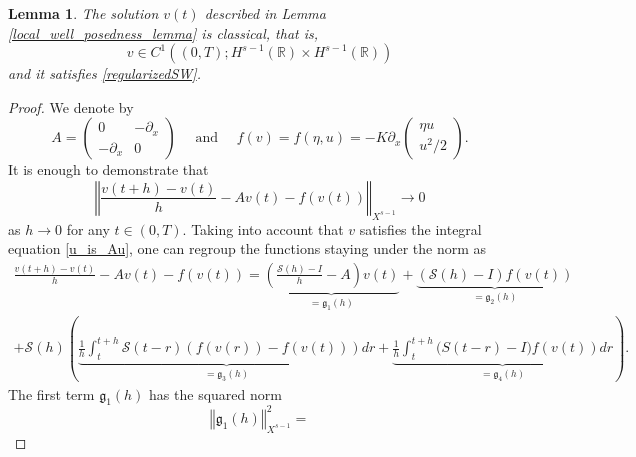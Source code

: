 \documentclass[reqno,12pt,a4paper]{article}
\theoremstyle{plain}
\newtheorem{lemma}[theorem]{\bf Lemma}
\newcommand{\R}{\mathbb{R}}
\newcommand{\norm}[1]{\left\Vert #1 \right\Vert}
\begin{document}
\begin{lemma}
\label{classical_solution_lemma}
    The solution $v(t)$ described in Lemma \ref{local_well_posedness_lemma}
    is classical,
    that is,
    \[
        v \in C^1 \left( (0, T); H^{s - 1}(\R) \times H^{s - 1}(\R) \right)
    \]
    and it satisfies \eqref{regularizedSW}.
\end{lemma}
%
\begin{proof}
%
We denote by
\begin{equation}
\label{A_and_f_definition}
    A
    =
    \begin{pmatrix}
        0
        &
        -\partial_x
        \\
        -\partial_x
        &
        0
    \end{pmatrix}
    \quad
    \text{ and }
    \quad
    f(v)
    =
    f(\eta, u)
    =
	-
    K \partial_x
	\begin{pmatrix}
		\eta u
		\\
		u^2 / 2
	\end{pmatrix}
    .
\end{equation}
%
It is enough to demonstrate that
\begin{equation*}
    \norm{
        \frac{v(t + h) - v(t)}h
        -
        Av(t)
        -
        f(v(t))
    }_{X^{s - 1}}
    \to 0
\end{equation*}
as $h \to 0$ for any $t \in (0, T)$.
Taking into account that $v$ satisfies the integral equation \eqref{u_is_Au},
one can regroup the functions staying under the norm as
\begin{multline*}
    \frac{v(t + h) - v(t)}h
    -
    Av(t)
    -
    f(v(t))
    =
    \underbrace{
        \left(
            \frac{ \mathcal S(h) - I }h - A
        \right)
        v(t)
    }_{
        = \mathfrak g_1(h)
    }
    +
    \underbrace{
        ( \mathcal S(h) - I )
        f(v(t))
    }_{
        = \mathfrak g_2(h)
    }
    \\
    +
    \mathcal S(h)
    \left(
        \underbrace{
            \frac 1h \int_t^{t + h}
            \mathcal S(t - r) ( f(v(r)) - f(v(t)) )
            dr
        }_{
            = \mathfrak g_3(h)
        }
        +
        \underbrace{
            \frac 1h \int_t^{t + h}
            \mathcal ( S(t - r) - I ) f(v(t))
            dr
        }_{
            = \mathfrak g_4(h)
        }
    \right)
    .
\end{multline*}
%
The first term $\mathfrak g_1(h)$ has the squared norm
\[
    \norm{ \mathfrak g_1(h) }_{X^{s- 1}}^2
    =
\]
\end{proof}
\end{document}
